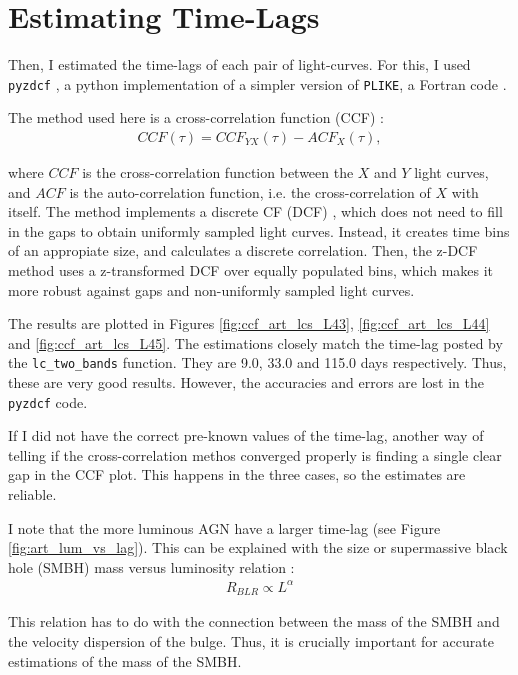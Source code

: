 \documentclass[letterpaper, oneside]{article}
\begin{document}
\section{Estimating Time-Lags}

Then, I estimated the time-lags of each pair of light-curves. For this, I used \texttt{pyzdcf} \cite{pyzdcf_docs}, a python implementation of a simpler version of \texttt{PLIKE}, a Fortran code \cite{Alexander_2013, tal_alexander_software}.

The method used here is a cross-correlation function (CCF) \cite{White_Peterson_1994}:
\begin{align}
	CCF(\tau) = CCF_{YX}(\tau) - ACF_{X}(\tau),
\end{align}

\noindent where $CCF$ is the cross-correlation function between the $X$ and $Y$ light curves, and $ACF$ is the auto-correlation function, i.e. the cross-correlation of $X$ with itself. The method implements a discrete CF (DCF) \cite{Edelson_Krolik_1988}, which does not need to fill in the gaps to obtain uniformly sampled light curves. Instead, it creates time bins of an appropiate size, and calculates a discrete correlation. Then, the z-DCF method uses a z-transformed DCF \cite{Alexander_1997} over equally populated bins, which makes it more robust against gaps and non-uniformly sampled light curves.

The results are plotted in Figures \ref{fig:ccf_art_lcs_L43}, \ref{fig:ccf_art_lcs_L44} and \ref{fig:ccf_art_lcs_L45}. The estimations closely match the time-lag posted by the \texttt{lc\_two\_bands} function. They are 9.0, 33.0 and 115.0 days respectively. Thus, these are very good results. However, the accuracies and errors are lost in the \texttt{pyzdcf} code.

If I did not have the correct pre-known values of the time-lag, another way of telling if the cross-correlation methos converged properly is finding a single clear gap in the CCF plot. This happens in the three cases, so the estimates are reliable.

I note that the more luminous AGN have a larger time-lag (see Figure \ref{fig:art_lum_vs_lag}). This can be explained with the size or supermassive black hole (SMBH) mass versus luminosity relation \cite{Kaspi_2007, Bentz_2009}:
\begin{align}
	R_{BLR} \propto L^{\alpha}
\end{align}

This relation has to do with the connection between the mass of the SMBH and the velocity dispersion of the bulge. Thus, it is crucially important for accurate estimations of the mass of the SMBH.
\end{document}
